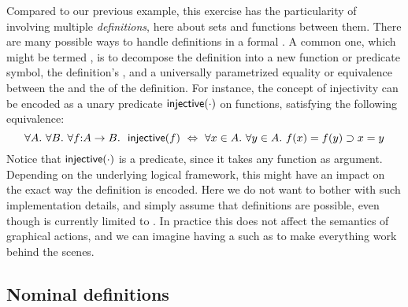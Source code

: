 \AP
Compared to our previous example, this exercise has the particularity of
involving multiple \emph{definitions}, here about sets and functions between
them. There are many possible ways to handle definitions in a formal . A common one, which might be termed , is to decompose
the definition into a new function or predicate symbol, the definition's
, and a universally parametrized equality or equivalence between the
 and the  of the definition. For instance, the concept of
injectivity can be encoded as a unary predicate $\mbox{\textsf{injective}}(\cdot)$ on
functions, satisfying the following equivalence:
$$\forall A.\ \forall B.\ \forall f{:}A \to B.~\ \injective(f) ~\lequiv~ \forall x
\in A.\ \forall y \in A.\ f(x) = f(y) \limp x = y$$
Notice that $\mbox{\textsf{injective}}(\cdot)$ is a \emph{} predicate, since it
takes any function as argument. Depending on the underlying logical framework,
this might have an impact on the exact way the definition is encoded. Here we do
not want to bother with such implementation details, and simply assume that
 definitions are possible, even though  is currently limited
to . In practice this does not affect the semantics of
graphical actions, and we can imagine having a   such as
 to make everything work behind the scenes.

\subsection{Nominal definitions}

